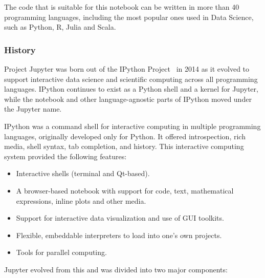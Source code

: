The code that is suitable for this notebook can be written in more than 40 programming
languages, including the most popular ones used in Data Science, such as Python, R, Julia
and Scala.

\subsubsection{History}

Project Jupyter was born out of the IPython Project~\cite{ipython:on,ipython-wikipedia:on}
in 2014 as it evolved to support interactive data science and scientific computing across
all programming languages.  IPython continues to exist as a Python shell and a kernel for
Jupyter, while the notebook and other language-agnostic parts of IPython moved under the
Jupyter name.

IPython was a command shell for interactive computing in multiple programming languages,
originally developed only for Python. It offered introspection, rich media, shell syntax,
tab completion, and history. This interactive computing system provided the following
features:

\begin{itemize}
\item Interactive shells (terminal and Qt-based).
\item A browser-based notebook with support for code, text, mathematical expressions,
  inline plots and other media.
\item Support for interactive data visualization and use of GUI toolkits.
\item Flexible, embeddable interpreters to load into one's own projects.
\item Tools for parallel computing.
\end{itemize}

Jupyter evolved from this and was divided into two major components:
 
